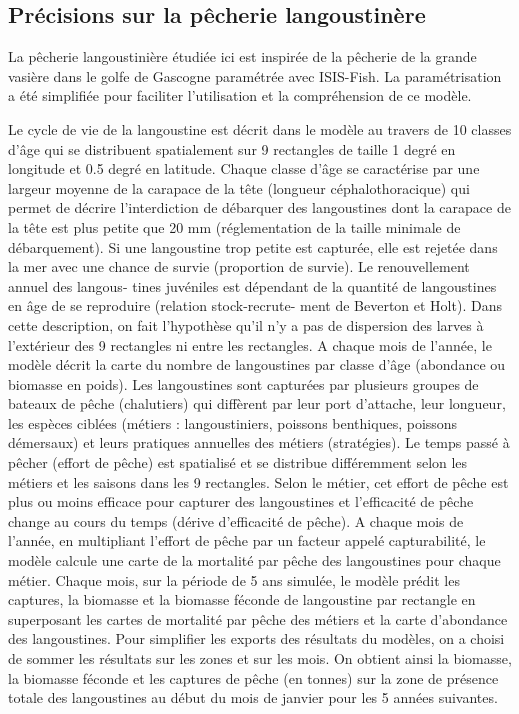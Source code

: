\documentclass[
]{article}
\begin{document}
\hypertarget{pruxe9cisions-sur-la-puxeacherie-langoustinuxe8re}{%
\subsection{Précisions sur la pêcherie
langoustinère}\label{pruxe9cisions-sur-la-puxeacherie-langoustinuxe8re}}

La pêcherie langoustinière étudiée ici est inspirée de la pêcherie de la
grande vasière dans le golfe de Gascogne paramétrée avec ISIS-Fish. La
paramétrisation a été simplifiée pour faciliter l'utilisation et la
compréhension de ce modèle.

Le cycle de vie de la langoustine est décrit dans le modèle au travers
de 10 classes d'âge qui se distribuent spatialement sur 9 rectangles de
taille 1 degré en longitude et 0.5 degré en latitude. Chaque classe
d'âge se caractérise par une largeur moyenne de la carapace de la tête
(longueur céphalothoracique) qui permet de décrire l'interdiction de
débarquer des langoustines dont la carapace de la tête est plus petite
que 20 mm (réglementation de la taille minimale de débarquement). Si une
langoustine trop petite est capturée, elle est rejetée dans la mer avec
une chance de survie (proportion de survie). Le renouvellement annuel
des langous- tines juvéniles est dépendant de la quantité de
langoustines en âge de se reproduire (relation stock-recrute- ment de
Beverton et Holt). Dans cette description, on fait l'hypothèse qu'il n'y
a pas de dispersion des larves à l'extérieur des 9 rectangles ni entre
les rectangles. A chaque mois de l'année, le modèle décrit la carte du
nombre de langoustines par classe d'âge (abondance ou biomasse en
poids). Les langoustines sont capturées par plusieurs groupes de bateaux
de pêche (chalutiers) qui diffèrent par leur port d'attache, leur
longueur, les espèces ciblées (métiers : langoustiniers, poissons
benthiques, poissons démersaux) et leurs pratiques annuelles des métiers
(stratégies). Le temps passé à pêcher (effort de pêche) est spatialisé
et se distribue différemment selon les métiers et les saisons dans les 9
rectangles. Selon le métier, cet effort de pêche est plus ou moins
efficace pour capturer des langoustines et l'efficacité de pêche change
au cours du temps (dérive d'efficacité de pêche). A chaque mois de
l'année, en multipliant l'effort de pêche par un facteur appelé
capturabilité, le modèle calcule une carte de la mortalité par pêche des
langoustines pour chaque métier. Chaque mois, sur la période de 5 ans
simulée, le modèle prédit les captures, la biomasse et la biomasse
féconde de langoustine par rectangle en superposant les cartes de
mortalité par pêche des métiers et la carte d'abondance des
langoustines. Pour simplifier les exports des résultats du modèles, on a
choisi de sommer les résultats sur les zones et sur les mois. On obtient
ainsi la biomasse, la biomasse féconde et les captures de pêche (en
tonnes) sur la zone de présence totale des langoustines au début du mois
de janvier pour les 5 années suivantes.
\end{document}
